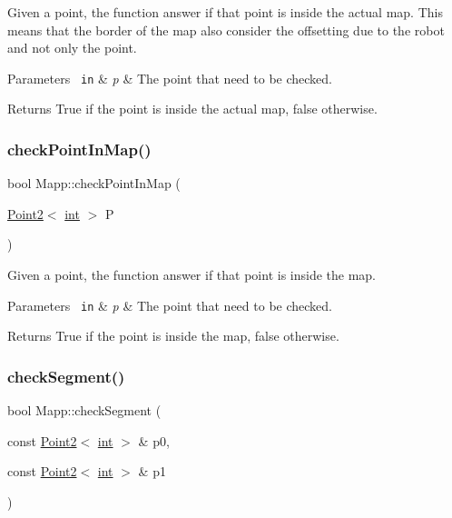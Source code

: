 Given a point, the function answer if that point is inside the actual map. This means that the border of the map also consider the offsetting due to the robot and not only the point. 


\begin{DoxyParams}[1]{Parameters}
\mbox{\texttt{ in}}  & {\em p} & The point that need to be checked. \\
\hline
\end{DoxyParams}
\begin{DoxyReturn}{Returns}
True if the point is inside the actual map, false otherwise. 
\end{DoxyReturn}
\mbox{\label{class_mapp_a149e89aed82f5fce047b03c9f90ccbf6}} 
\subsubsection{\texorpdfstring{checkPointInMap()}{checkPointInMap()}}
{\footnotesize\ttfamily bool Mapp\+::check\+Point\+In\+Map (\begin{DoxyParamCaption}\item[{\mbox{\hyperlink{class_point2}{Point2}}$<$ \mbox{\hyperlink{draw_8hh_aa620a13339ac3a1177c86edc549fda9b}{int}} $>$}]{P }\end{DoxyParamCaption})}



Given a point, the function answer if that point is inside the map. 


\begin{DoxyParams}[1]{Parameters}
\mbox{\texttt{ in}}  & {\em p} & The point that need to be checked. \\
\hline
\end{DoxyParams}
\begin{DoxyReturn}{Returns}
True if the point is inside the map, false otherwise. 
\end{DoxyReturn}
\mbox{\label{class_mapp_ade6135be96d93778352a7a313793adf3}} 
\subsubsection{\texorpdfstring{checkSegment()}{checkSegment()}}
{\footnotesize\ttfamily bool Mapp\+::check\+Segment (\begin{DoxyParamCaption}\item[{const \mbox{\hyperlink{class_point2}{Point2}}$<$ \mbox{\hyperlink{draw_8hh_aa620a13339ac3a1177c86edc549fda9b}{int}} $>$ \&}]{p0,  }\item[{const \mbox{\hyperlink{class_point2}{Point2}}$<$ \mbox{\hyperlink{draw_8hh_aa620a13339ac3a1177c86edc549fda9b}{int}} $>$ \&}]{p1 }\end{DoxyParamCaption})}



